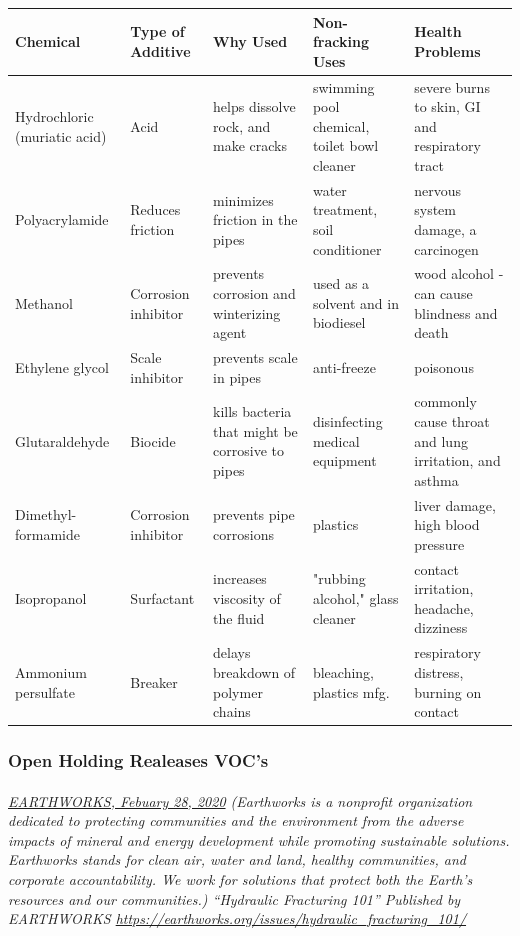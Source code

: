 \documentclass{article}
\begin{document}
\begin{table}[h!]
  \begin{center}
    \begin{tabular}{p{2.5cm} | p{1.7cm} | p{3cm} | p{3.5cm} | p{4.2cm}} %
      \textbf{Chemical} & \textbf{Type of Additive} & \textbf{Why Used}& \textbf{Non-fracking Uses}& \textbf{Health Problems}\\

      \midrule
      Hydrochloric (muriatic acid) & Acid & helps dissolve rock, and make cracks & swimming pool chemical, toilet bowl cleaner & severe burns to skin, GI and respiratory tract\\
      \midrule
      Polyacrylamide & Reduces friction & minimizes friction in the pipes & water treatment, soil conditioner & nervous system damage, a carcinogen\\
      \midrule
      Methanol&Corrosion inhibitor&prevents corrosion and winterizing agent&used as a solvent and in biodiesel&wood alcohol - can cause blindness and death\\
      \midrule
      Ethylene glycol&Scale inhibitor&prevents scale in pipes&anti-freeze&poisonous\\
      \midrule
      Glutaraldehyde&Biocide&kills bacteria that might be corrosive to pipes&disinfecting medical equipment&commonly cause throat and lung irritation, and asthma\\
      \midrule
      Dimethyl-formamide&Corrosion inhibitor&prevents pipe corrosions&plastics&liver damage, high blood pressure\\
      \midrule
      Isopropanol&Surfactant&increases viscosity of the fluid&"rubbing alcohol," glass cleaner&contact irritation, headache, dizziness\\
      \midrule
      Ammonium persulfate&Breaker&delays breakdown of polymer chains&bleaching, plastics mfg.&respiratory distress, burning on contact

    \end{tabular}
  \end{center}
\end{table}

\subsubsection{Open Holding Realeases VOC's}
\paragraph{}
\small
\textit{
\underline{EARTHWORKS, Febuary 28, 2020}
(Earthworks is a nonprofit organization dedicated to protecting communities and the environment from the adverse impacts of mineral and energy development while promoting sustainable solutions. Earthworks stands for clean air, water and land, healthy communities, and corporate accountability. We work for solutions that protect both the Earth’s resources and our communities.) “Hydraulic Fracturing 101” Published by EARTHWORKS 
\url{https://earthworks.org/issues/hydraulic_fracturing_101/}}
\normalsize
\end{document}

